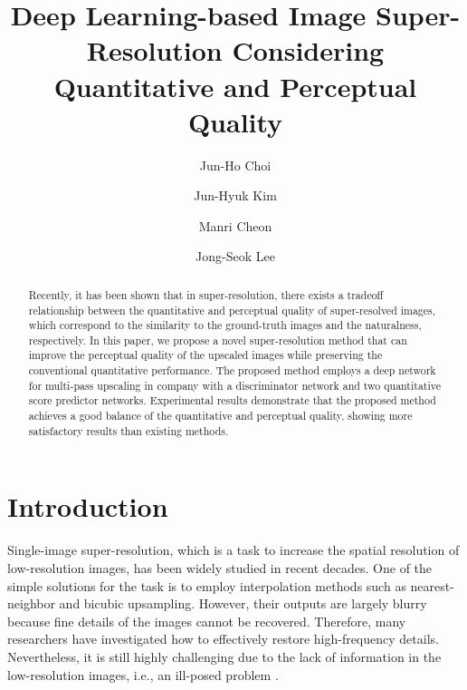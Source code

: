 \documentclass[runningheads]{llncs}
\begin{document}
\title{Deep Learning-based Image Super-Resolution Considering Quantitative and Perceptual Quality} 

\author{Jun-Ho Choi \and Jun-Hyuk Kim \and Manri Cheon \and Jong-Seok Lee}

\maketitle              %
\begin{abstract}
Recently, it has been shown that in super-resolution, there exists a tradeoff relationship between the quantitative and perceptual quality of super-resolved images, which correspond to the similarity to the ground-truth images and the naturalness, respectively.
In this paper, we propose a novel super-resolution method that can improve the perceptual quality of the upscaled images while preserving the conventional quantitative performance.
The proposed method employs a deep network for multi-pass upscaling in company with a discriminator network and two quantitative score predictor networks.
Experimental results demonstrate that the proposed method achieves a good balance of the quantitative and perceptual quality, showing more satisfactory results than existing methods.

\end{abstract}
\section{Introduction}

Single-image super-resolution, which is a task to increase the spatial resolution of low-resolution images, has been widely studied in recent decades.
One of the simple solutions for the task is to employ interpolation methods such as nearest-neighbor and bicubic upsampling.
However, their outputs are largely blurry because fine details of the images cannot be recovered.
Therefore, many researchers have investigated how to effectively restore high-frequency details.
Nevertheless, it is still highly challenging due to the lack of information in the low-resolution images, i.e., an ill-posed problem \cite{ledig2017photo}.
\end{document}

